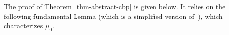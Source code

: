 %
%

The proof of Theorem~\ref{thm-abstract-cbp} is given below.
It relies on the following fundamental Lemma (which is a simplified version of~\cite[Lemma 4]{2016-duval-thinlasso}), which characterizes $\mu_0$. 

